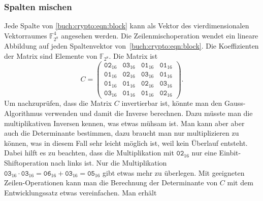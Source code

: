 \subsubsection{Spalten mischen}
Jede Spalte von \eqref{buch:crypto:eqn:block} kann als Vektor des
vierdimensionalen Vektorraumes $\mathbb{F}_{2^8}^4$ angesehen werden.
Die Zeilenmischoperation wendet ein lineare Abbildung auf jeden
Spaltenvektor von~\eqref{buch:crypto:eqn:block}.
Die Koeffizienten der Matrix sind Elemente von $\mathbb{F}_{2^8}$.
Die Matrix ist
\[
C=\begin{pmatrix}
\texttt{02}_{16}&\texttt{03}_{16}&\texttt{01}_{16}&\texttt{01}_{16}\\
\texttt{01}_{16}&\texttt{02}_{16}&\texttt{03}_{16}&\texttt{01}_{16}\\
\texttt{01}_{16}&\texttt{01}_{16}&\texttt{02}_{16}&\texttt{03}_{16}\\
\texttt{03}_{16}&\texttt{01}_{16}&\texttt{01}_{16}&\texttt{02}_{16}
\end{pmatrix}.
\]
Um nachzuprüfen, dass die Matrix $C$ invertierbar ist, könnte man den
Gauss-Algorithmus verwenden und damit die Inverse berechnen.
Dazu müsste man die multiplikativen Inversen kennen, was etwas mühsam
ist.
Man kann aber aber auch die Determinante bestimmen, dazu braucht man
nur multiplizieren zu können, was in diesem Fall sehr leicht möglich ist,
weil kein Überlauf entsteht.
Dabei hilft es zu beachten, dass die Multiplikation mit $\texttt{02}_{16}$
nur eine Einbit-Shiftoperation nach links ist.
Nur die Multiplikation $\texttt{03}_{16}\cdot\texttt{03}_{16}
=
\texttt{06}_{16}+\texttt{03}_{16}=\texttt{05}_{16}$
gibt etwas mehr zu überlegen.
Mit geeigneten Zeilen-Operationen kann man die Berechnung der Determinante
von $C$ mit dem Entwicklungssatz etwas vereinfachen.
Man erhält
